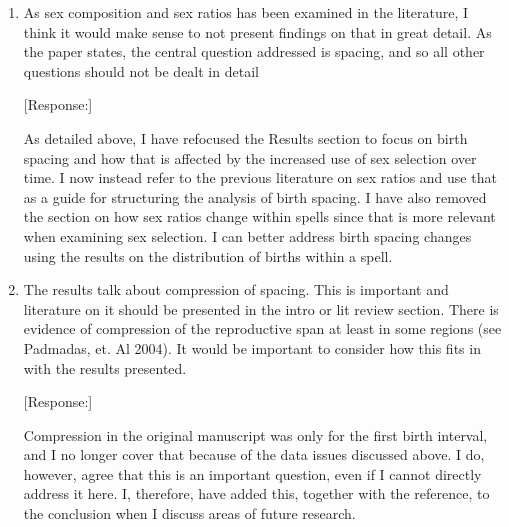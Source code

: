 \documentclass[letterpaper,12pt]{article}
\begin{document}
\begin{enumerate}
[Response:]

Using graphs is an excellent suggestion.
Instead of the tables, I now show graphs for each of the education levels.
For each spell, I show the predicted average spacing, the predicted sex ratio, and the 
probability of having a birth by the end of the spell for each decade.
Including the probability of having a birth allows me to discuss the falling fertility 
more organically as requested by the editor.

The only downside is that I had to remove the confidence intervals for legibility. 
I, therefore, still include Tables 1-3, but have moved them to the Appendix, and I have 
added the probability of having a birth by the end of the spell to the tables.
I have also combined the 75th, 50th, and 25th percentiles results tables in the Appendix.

\item As sex composition and sex ratios has been examined in the literature, I think
it would make sense to not present findings on that in great detail. As
the paper states, the central question addressed is spacing, and so all
other questions should not be dealt in detail

[Response:]

As detailed above, I have refocused the Results section to focus on birth spacing and how 
that is affected by the increased use of sex selection over time.
I now instead refer to the previous literature on sex ratios and use that as a guide for
structuring the analysis of birth spacing.
I have also removed the section on how sex ratios change within spells since that is
more relevant when examining sex selection.
I can better address birth spacing changes using the results on the distribution of 
births within a spell.


\item The results talk about compression of spacing. This is important and
literature on it should be presented in the intro or lit review section.
There is evidence of compression of the reproductive span at least in
some regions (see Padmadas, et. Al 2004). It would be important to
consider how this fits in with the results presented.

[Response:]

Compression in the original manuscript was only for the first birth interval, and I no 
longer cover that because of the data issues discussed above.
I do, however, agree that this is an important question, even if I cannot directly
address it here.
I, therefore, have added this, together with the reference, to the conclusion when I 
discuss areas of future research.



\end{enumerate}
\end{document}
